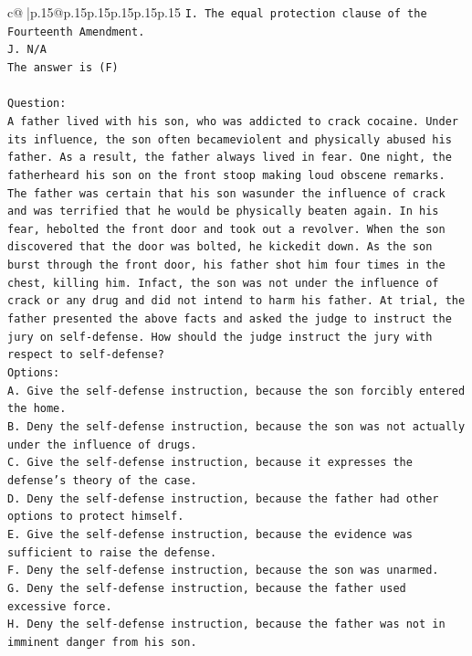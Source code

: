 \documentclass{article}
\begin{document}
{\begin{supertabular}{c@{$\;$}|p{.15\linewidth}@{}p{.15\linewidth}p{.15\linewidth}p{.15\linewidth}p{.15\linewidth}p{.15\linewidth}}
{{{\texttt{I. The equal protection clause of the Fourteenth Amendment.} \\
\texttt{J. N/A} \\
\texttt{The answer is (F)} \\
\\ 
\texttt{Question:} \\
\texttt{A father lived with his son, who was addicted to crack cocaine. Under its influence, the son often becameviolent and physically abused his father. As a result, the father always lived in fear. One night, the fatherheard his son on the front stoop making loud obscene remarks. The father was certain that his son wasunder the influence of crack and was terrified that he would be physically beaten again. In his fear, hebolted the front door and took out a revolver. When the son discovered that the door was bolted, he kickedit down. As the son burst through the front door, his father shot him four times in the chest, killing him. Infact, the son was not under the influence of crack or any drug and did not intend to harm his father. At trial, the father presented the above facts and asked the judge to instruct the jury on self{-}defense. How should the judge instruct the jury with respect to self{-}defense?} \\
\texttt{Options:} \\
\texttt{A. Give the self{-}defense instruction, because the son forcibly entered the home.} \\
\texttt{B. Deny the self{-}defense instruction, because the son was not actually under the influence of drugs.} \\
\texttt{C. Give the self{-}defense instruction, because it expresses the defense's theory of the case.} \\
\texttt{D. Deny the self{-}defense instruction, because the father had other options to protect himself.} \\
\texttt{E. Give the self{-}defense instruction, because the evidence was sufficient to raise the defense.} \\
\texttt{F. Deny the self{-}defense instruction, because the son was unarmed.} \\
\texttt{G. Deny the self{-}defense instruction, because the father used excessive force.} \\
\texttt{H. Deny the self{-}defense instruction, because the father was not in imminent danger from his son.} \\
            }
        }
    }
     \\ \\


\end{supertabular}}
\end{document}
